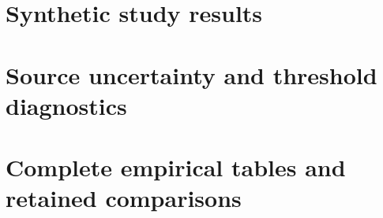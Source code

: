 \section{Synthetic study results}\label{study16:results}

\clearpage
\section{Source uncertainty and threshold diagnostics}\label{study16:diagnostics}


\clearpage
\section{Complete empirical tables and retained comparisons}\label{study16:tables}

